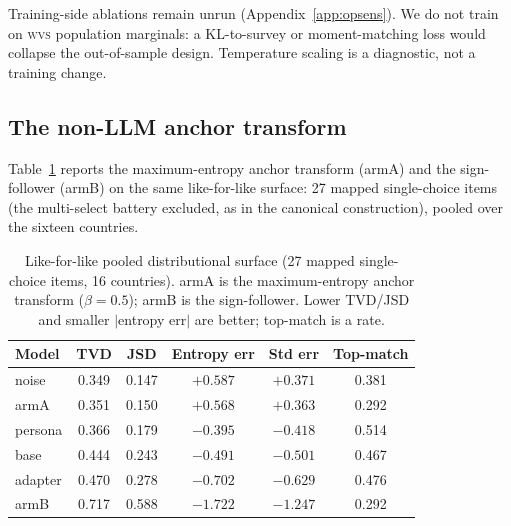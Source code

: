 \documentclass[10pt,letterpaper]{article}
\newcommand{\WVS}{\textsc{wvs}}
\begin{document}
Training-side ablations remain unrun (Appendix~\ref{app:opsens}). We do not train on \WVS{} population marginals: a KL-to-survey or moment-matching loss would collapse the out-of-sample design. Temperature scaling is a diagnostic, not a training change.

\subsection{The non-LLM anchor transform}
Table~\ref{tab:res-nonllm} reports the maximum-entropy anchor transform (armA) and the sign-follower (armB) on the same like-for-like surface: 27 mapped single-choice items (the multi-select battery excluded, as in the canonical construction), pooled over the sixteen countries.

\begin{table}[H]
\centering\small
\caption{Like-for-like pooled distributional surface (27 mapped single-choice items, 16 countries). armA is the maximum-entropy anchor transform ($\beta=0.5$); armB is the sign-follower. Lower TVD/JSD and smaller $|$entropy err$|$ are better; top-match is a rate.}\label{tab:res-nonllm}
\begin{tabular}{lccccc}
\toprule
Model & TVD & JSD & Entropy err & Std err & Top-match\\
\midrule
noise & 0.349 & 0.147 & $+0.587$ & $+0.371$ & 0.381\\
armA & 0.351 & 0.150 & $+0.568$ & $+0.363$ & 0.292\\
persona & 0.366 & 0.179 & $-0.395$ & $-0.418$ & 0.514\\
base & 0.444 & 0.243 & $-0.491$ & $-0.501$ & 0.467\\
adapter & 0.470 & 0.278 & $-0.702$ & $-0.629$ & 0.476\\
armB & 0.717 & 0.588 & $-1.722$ & $-1.247$ & 0.292\\
\bottomrule
\end{tabular}
\end{table}
\end{document}
